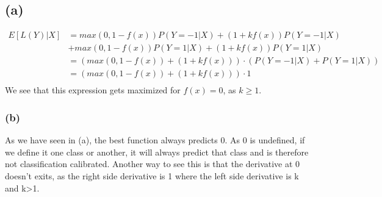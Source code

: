 \documentclass[a4paper]{scrartcl}
\begin{document}
  \subsection*{(a)}
  \begin{align*}
    E[L(Y)|X]
    &= max(0, 1-f(x)) P(Y=-1|X) + (1 + kf(x)) P(Y=-1|X) \\&+ max(0, 1-f(x)) P(Y=1|X) + (1 + kf(x)) P(Y=1|X)\\
    &= (max(0, 1-f(x)) + (1 + kf(x))) \cdot (P(Y=-1|X) + P(Y=1|X))\\
    &= (max(0, 1-f(x)) + (1 + kf(x))) \cdot 1\\
  \end{align*}
  We see that this expression gets maximized for $f(x) = 0$, as $k\geq 1$.







  \subsubsection*{(b)}
  As we have seen in (a), the best function always predicts 0. As 0 is
  undefined, if we define it one class or another, it will always predict that
  class and is therefore not classification calibrated. Another way to see this
  is that the derivative at 0 doesn't exits, as the right side derivative is 1
  where the left side derivative is k and k>1.
\end{document}
